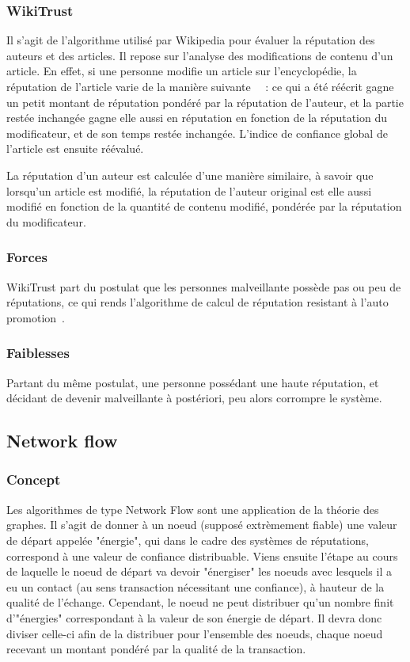 \documentclass[a4paper, 11pt]{article} %
\begin{document}
\subsubsection{WikiTrust}
Il s'agit de l'algorithme utilisé par Wikipedia pour évaluer la réputation des auteurs et des articles. Il repose sur l'analyse des modifications de contenu d'un article.
En effet, si une personne modifie un article sur l'encyclopédie, la réputation de l'article varie de la manière suivante~\cite{WikiTrust2010}~\cite{WikiTrustSite} :
ce qui a été réécrit gagne un petit montant de réputation pondéré par la réputation de l'auteur,
et la partie restée inchangée gagne elle aussi en réputation en fonction de la réputation du modificateur, et de son temps restée inchangée.
L'indice de confiance global de l'article est ensuite réévalué.

La réputation d'un auteur est calculée d'une manière similaire, à savoir que lorsqu'un article est modifié,
la réputation de l'auteur original est elle aussi modifié en fonction de la quantité de contenu modifié, pondérée par la réputation du modificateur.

\subsubsection{Forces}
WikiTrust part du postulat que les personnes malveillante possède pas ou peu de réputations, ce qui rends l'algorithme de calcul de réputation resistant à l'auto promotion~\cite{Tulungan2013}.

\subsubsection{Faiblesses}
Partant du même postulat, une personne possédant une haute réputation, et décidant de devenir malveillante à postériori, peu alors corrompre le système.

\subsection{Network flow}
\subsubsection{Concept}
Les algorithmes de type Network Flow sont une application de la théorie des graphes.
Il s'agit de donner à un noeud (supposé extrèmement fiable) une valeur de départ appelée "énergie", qui dans le cadre des systèmes de réputations, correspond à une valeur de confiance distribuable.
Viens ensuite l'étape au cours de laquelle le noeud de départ va devoir "énergiser" les noeuds avec lesquels il a eu un contact (au sens transaction nécessitant une confiance), à hauteur de la qualité de l'échange.
Cependant, le noeud ne peut distribuer qu'un nombre finit d'"énergies" correspondant à la valeur de son énergie de départ.
Il devra donc diviser celle-ci afin de la distribuer pour l'ensemble des noeuds, chaque noeud recevant un montant pondéré par la qualité de la transaction.
\end{document}
